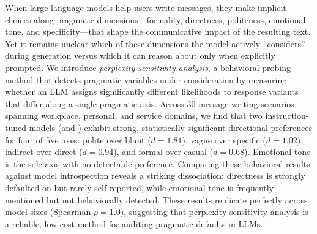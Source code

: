 When large language models help users write messages, they make implicit choices along pragmatic dimensions---formality, directness, politeness, emotional tone, and specificity---that shape the communicative impact of the resulting text. Yet it remains unclear which of these dimensions the model actively ``considers'' during generation versus which it can reason about only when explicitly prompted. We introduce \emph{perplexity sensitivity analysis}, a behavioral probing method that detects pragmatic variables under consideration by measuring whether an LLM assigns significantly different likelihoods to response variants that differ along a single pragmatic axis. Across 30 message-writing scenarios spanning workplace, personal, and service domains, we find that two instruction-tuned models (\qwenseven and \qwenthree) exhibit strong, statistically significant directional preferences for four of five axes: polite over blunt ($d{=}1.81$), vague over specific ($d{=}1.02$), indirect over direct ($d{=}0.94$), and formal over casual ($d{=}0.68$). Emotional tone is the sole axis with no detectable preference. Comparing these behavioral results against model introspection reveals a striking dissociation: directness is strongly defaulted on but rarely self-reported, while emotional tone is frequently mentioned but not behaviorally detected. These results replicate perfectly across model sizes (Spearman $\rho{=}1.0$), suggesting that perplexity sensitivity analysis is a reliable, low-cost method for auditing pragmatic defaults in LLMs.
